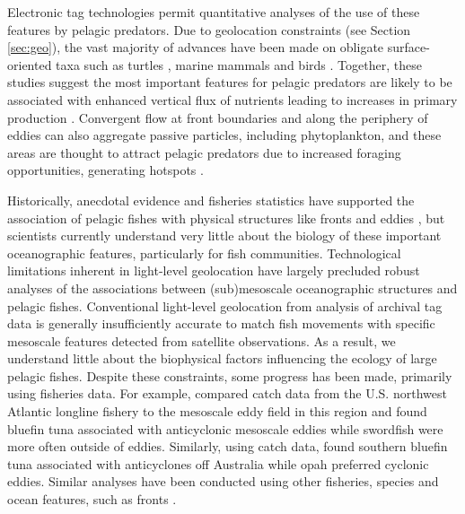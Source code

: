 Electronic tag technologies permit quantitative analyses of the use of these features by pelagic predators. Due to geolocation constraints (see Section \ref{sec:geo}), the vast majority of advances have been made on obligate surface-oriented taxa such as turtles \citep[\eg][]{Gaube2017, Polovina2006, Kobayashi2011}, marine mammals \citep[\eg][]{Johnston2007, Bailleul2010} and birds \citep[\eg][]{Thorne2013, TewKai2009}. Together, these studies suggest the most important features for pelagic predators are likely to be associated with enhanced vertical flux of nutrients leading to increases in primary production \citep{Franks1992}. Convergent flow at front boundaries and along the periphery of eddies can also aggregate passive particles, including phytoplankton, and these areas are thought to attract pelagic predators due to increased foraging opportunities, generating hotspots \citep{Scales2014}.


Historically, anecdotal evidence and fisheries statistics have supported the association of pelagic fishes with physical structures like fronts and eddies \citep[e.g.,][]{Hobday2014}, but scientists currently understand very little about the biology of these important oceanographic features, particularly for fish communities. Technological limitations inherent in light-level geolocation \citep{Braun2015} have largely precluded robust analyses of the associations between (sub)mesoscale oceanographic structures and pelagic fishes. Conventional light-level geolocation from analysis of archival tag data is generally insufficiently accurate to match fish movements with specific mesoscale features detected from satellite observations. As a result, we understand little about the biophysical factors influencing the ecology of large pelagic fishes. Despite these constraints, some progress has been made, primarily using fisheries data. For example, \cite{Hsu2015} compared catch data from the U.S. northwest Atlantic longline fishery to the mesoscale eddy field in this region and found bluefin tuna associated with anticyclonic mesoscale eddies while swordfish were more often outside of eddies. Similarly, using catch data, \cite{Hobday2014} found southern bluefin tuna associated with anticyclones off Australia while opah preferred cyclonic eddies. Similar analyses have been conducted using other fisheries, species and ocean features, such as fronts \citep[\eg][]{Worm2005}.

